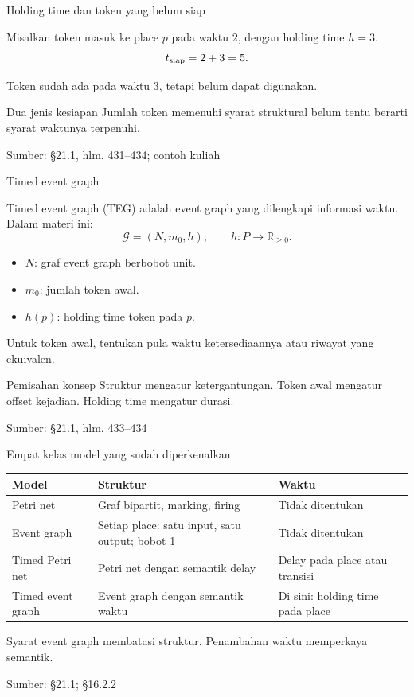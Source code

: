 \documentclass[aspectratio=169,11pt]{beamer}
\newcommand{\source}[1]{%
    \vfill
    \hfill{\tiny\color{gray}Sumber: #1}
}
\begin{document}
\begin{frame}{Holding time dan token yang belum siap}

Misalkan token masuk ke place $p$ pada waktu $2$, dengan holding time $h=3$.
\[
t_{\rm siap}=2+3=5.
\]
\begin{center}\end{center}
Token sudah ada pada waktu $3$, tetapi belum dapat digunakan.
\begin{block}{Dua jenis kesiapan}
Jumlah token memenuhi syarat struktural belum tentu berarti syarat waktunya terpenuhi.
\end{block}

\source{\S21.1, hlm. 431--434; contoh kuliah}
\end{frame}
\begin{frame}{Timed event graph}

Timed event graph (TEG) adalah event graph yang dilengkapi informasi waktu.
Dalam materi ini:
\[
\mathcal G=(N,m_0,h),\qquad h:P\to\mathbb R_{\ge0}.
\]
\begin{itemize}
\item $N$: graf event graph berbobot unit.
\item $m_0$: jumlah token awal.
\item $h(p)$: holding time token pada $p$.
\end{itemize}
Untuk token awal, tentukan pula waktu ketersediaannya atau riwayat yang ekuivalen.
\begin{block}{Pemisahan konsep}
Struktur mengatur ketergantungan. Token awal mengatur offset kejadian.
Holding time mengatur durasi.
\end{block}

\source{\S21.1, hlm. 433--434}
\end{frame}
\begin{frame}{Empat kelas model yang sudah diperkenalkan}

\begin{center}\begin{tabular}{p{2.6cm}p{5cm}p{4cm}}\toprule
Model&Struktur&Waktu\\\midrule
Petri net&Graf bipartit, marking, firing&Tidak ditentukan\\[2mm]
Event graph&Setiap place: satu input, satu output; bobot 1&Tidak ditentukan\\[2mm]
Timed Petri net&Petri net dengan semantik delay&Delay pada place atau transisi\\[2mm]
Timed event graph&Event graph dengan semantik waktu&Di sini: holding time pada place\\\bottomrule
\end{tabular}\end{center}
Syarat event graph membatasi struktur. Penambahan waktu memperkaya semantik.

\source{\S21.1; \S16.2.2}
\end{frame}
\end{document}
